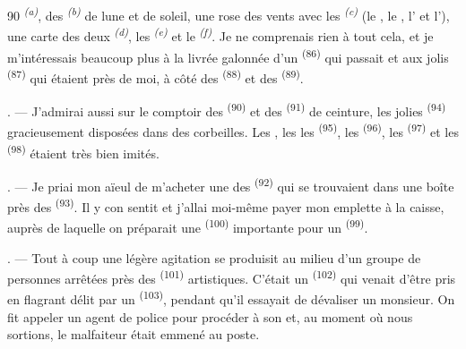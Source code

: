 \begin{VUpage}[92]{90}
\VUcontinue
{}\textsuperscript{\textit{(a)}}, des \textsuperscript{\textit{(b)}} de lune et de soleil,\nl
une rose des vents avec les \cc
{}\textsuperscript{\textit{(c)}} (le , le , l' et l'), une\nl
carte des deux \textsuperscript{\textit{(d)}}, les \textsuperscript{\textit{(e)}} et\nl
le \textsuperscript{\textit{(f)}}. Je ne comprenais rien à tout\nl
cela, et je m'intéressais beaucoup plus à la livrée\nl
galonnée d'un \textsuperscript{(86)} qui passait et aux\nl
jolis \textsuperscript{(87)} qui étaient près de moi, à côté des\nl
{}\textsuperscript{(88)} et des \textsuperscript{(89)}.

. --- J'admirai aussi sur le comptoir des \cc
{}\textsuperscript{(90)} et des \textsuperscript{(91)} de ceinture, les jolies\nl
{}\textsuperscript{(94)} gracieusement disposées\nl
dans des corbeilles. Les , les \nl
les \textsuperscript{(95)}, les \textsuperscript{(96)}, les \textsuperscript{(97)} et\nl
les \textsuperscript{(98)} étaient très bien imités.

. --- Je priai mon aïeul de m'acheter une des\nl
{}\textsuperscript{(92)} qui se trouvaient dans une\nl
boîte près des \textsuperscript{(93)}. Il y con\cc
sentit et j'allai moi-même payer mon emplette à la\nl
caisse, auprès de laquelle on préparait une \cc
{}\textsuperscript{(100)} importante pour un \textsuperscript{(99)}.

. --- Tout à coup une légère agitation se produisit\nl
au milieu d'un groupe de personnes arrêtées près des\nl
{}\textsuperscript{(101)} artistiques. C'était un \textsuperscript{(102)} qui\nl
venait d'être pris en flagrant délit par un \cc
{}\textsuperscript{(103)}, pendant qu'il essayait de dévaliser un\nl
monsieur. On fit appeler un agent de police pour\nl
procéder à son  et, au moment où nous\nl
sortions, le malfaiteur était emmené au poste.

\VUsaut{6.0mm}
\VUfilet{22mm}
\end{VUpage}
